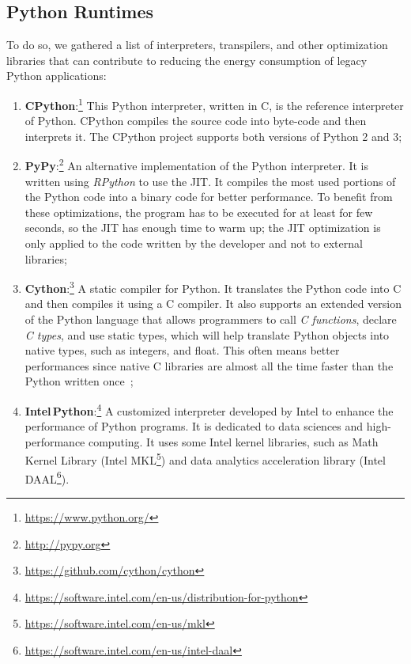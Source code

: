 \subsection{Python Runtimes}\label{python:sec_interpreters}
To do so, we gathered a list of interpreters, transpilers, and other optimization libraries that can contribute to reducing the energy consumption of legacy Python applications:
\begin{enumerate}
      \item \textbf{CPython}:\footnote{\url{https://www.python.org/}}
            This Python interpreter, written in C, is the reference interpreter of Python.
            CPython compiles the source code into byte-code and then interprets it.
            The CPython project supports both versions of Python 2 and 3;
      \item \textbf{PyPy}:\footnote{\url{http://pypy.org}}
            An alternative implementation of the Python interpreter.
            It is written using \emph{RPython} to use the JIT.
            It compiles the most used portions of the Python code into a binary code for better performance.
            To benefit from these optimizations, the program has to be executed for at least for few seconds, so the JIT has enough time to warm up; the JIT optimization is only applied to the code written by the developer and not to external libraries;
      \item \textbf{Cython}:\footnote{\url{https://github.com/cython/cython}}
            A static compiler for Python.
            It translates the Python code into C and then compiles it using a C compiler.
            It also supports an extended version of the Python language that allows programmers to call \emph{C functions}, declare \emph{C types}, and use static types, which will help translate Python objects into native types, such as integers, and float.
            This often means better performances since native C libraries are almost all the time faster than the Python written once~\cite{pereira_energy_2017};
      \item \textbf{Intel\,Python}:\footnote{\url{https://software.intel.com/en-us/distribution-for-python}}
            A customized interpreter developed by Intel to enhance the performance of Python programs.
            It is dedicated to data sciences and high-performance computing.
            It uses some Intel kernel libraries, such as Math Kernel Library (Intel MKL\footnote{\url{https://software.intel.com/en-us/mkl}}) and data analytics acceleration library (Intel DAAL\footnote{\url{https://software.intel.com/en-us/intel-daal}}).

\end{enumerate}
